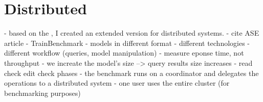 \section{Distributed \tb{}}
\label{distributed-trainbenchmark}



- based on the \tb{}, I created an extended version for distributed systems. 
  - cite ASE article
  - TrainBenchmark
  - models in different format
  - different technologies
  - different workflow (queries, model manipulation)
  - measure eponse time, not throughput
  - we increate the model's size --> query results size increases
  - read check edit check phases
  - the benchmark runs on a coordinator and delegates the operations to a distributed system
  - one user uses the entire cluster (for benchmarking purposes)
